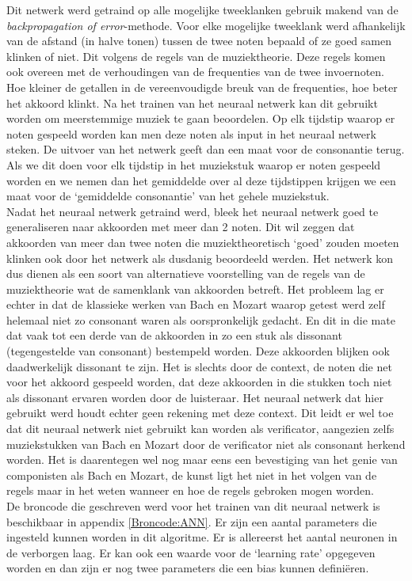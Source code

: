 Dit netwerk werd getraind op alle mogelijke tweeklanken gebruik makend van de \textit{backpropagation of error}-methode\cite{url:backpropagation}. Voor elke mogelijke tweeklank werd afhankelijk van de afstand (in halve tonen) tussen de twee noten bepaald of ze goed samen klinken of niet. Dit volgens de regels van de muziektheorie. Deze regels komen ook overeen met de verhoudingen van de frequenties van de twee invoernoten. Hoe kleiner de getallen in de vereenvoudigde breuk van de frequenties, hoe beter het akkoord klinkt. Na het trainen van het neuraal netwerk kan dit gebruikt worden om meerstemmige muziek te gaan beoordelen. Op elk tijdstip waarop er noten gespeeld worden kan men deze noten als input in het neuraal netwerk steken. De uitvoer van het netwerk geeft dan een maat voor de consonantie terug. Als we dit doen voor elk tijdstip in het muziekstuk waarop er noten gespeeld worden en we nemen dan het gemiddelde over al deze tijdstippen krijgen we een maat voor de `gemiddelde consonantie' van het gehele muziekstuk.\\
Nadat het neuraal netwerk getraind werd, bleek het neuraal netwerk goed te generaliseren naar akkoorden met meer dan 2 noten. Dit wil zeggen dat akkoorden van meer dan twee noten die muziektheoretisch `goed' zouden moeten klinken ook door het netwerk als dusdanig beoordeeld werden. Het netwerk kon dus dienen als een soort van alternatieve voorstelling van de regels van de muziektheorie wat de samenklank van akkoorden betreft. Het probleem lag er echter in dat de klassieke werken van Bach \cite{url:bach} en Mozart \cite{url:mozart} waarop getest werd zelf helemaal niet zo consonant waren als oorspronkelijk gedacht. En dit in die mate dat vaak tot een derde van de akkoorden in zo een stuk als dissonant (tegengestelde van consonant) bestempeld worden. Deze akkoorden blijken ook daadwerkelijk dissonant te zijn. Het is slechts door de context, de noten die net voor het akkoord gespeeld worden, dat deze akkoorden in die stukken toch niet als dissonant ervaren worden door de luisteraar. Het neuraal netwerk dat hier gebruikt werd houdt echter geen rekening met deze context. Dit leidt er wel toe dat dit neuraal netwerk niet gebruikt kan worden als verificator, aangezien zelfs muziekstukken van Bach en Mozart door de verificator niet als consonant herkend worden. Het is daarentegen wel nog maar eens een bevestiging van het genie van componisten als Bach en Mozart, de kunst ligt het niet in het volgen van de regels maar in het weten wanneer en hoe de regels gebroken mogen worden.\\
De broncode die geschreven werd voor het trainen van dit neuraal netwerk is beschikbaar in appendix \ref{Broncode:ANN}. Er zijn een aantal parameters die ingesteld kunnen worden in dit algoritme. Er is allereerst het aantal neuronen in de verborgen laag. Er kan ook een waarde voor de `learning rate' opgegeven worden en dan zijn er nog twee parameters die een bias kunnen defini\"eren.

